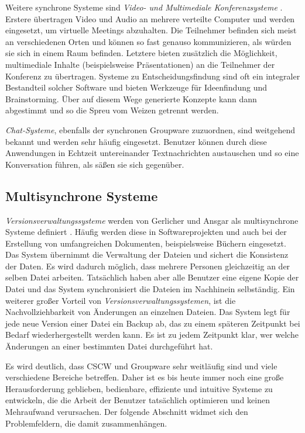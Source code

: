 Weitere synchrone Systeme sind \emph{Video- und Multimediale Konferenzsysteme} \citep{Gerlicher:2007p241}. Erstere übertragen Video und Audio an mehrere verteilte Computer und werden eingesetzt, um virtuelle Meetings abzuhalten. Die Teilnehmer befinden sich meist an verschiedenen Orten und können so fast genauso kommunizieren, als würden sie sich in einem Raum befinden. Letztere bieten zusätzlich die Möglichkeit, multimediale Inhalte (beispielsweise Präsentationen) an die Teilnehmer der Konferenz zu übertragen. Systeme zu Entscheidungsfindung sind oft ein integraler Bestandteil solcher Software und bieten Werkzeuge für Ideenfindung und Brainstorming. Über auf diesem Wege generierte Konzepte kann dann abgestimmt und so die Spreu vom Weizen getrennt werden. 

\emph{Chat-Systeme}, ebenfalls der synchronen Groupware zuzuordnen, sind weitgehend bekannt und werden sehr häufig eingesetzt. Benutzer können durch diese Anwendungen in Echtzeit untereinander Textnachrichten austauschen und so eine Konversation führen, als säßen sie sich gegenüber. 

\subsection{Multisynchrone Systeme}\label{sec:multisynchronousCSCW}

\emph{Versionsverwaltungssysteme} werden von Gerlicher und Ansgar als multisynchrone Systeme definiert \citep{Gerlicher:2007p241}. Häufig werden diese in Softwareprojekten und auch bei der Erstellung von umfangreichen Dokumenten, beispielsweise Büchern eingesetzt. Das System übernimmt die Verwaltung der Dateien und sichert die Konsistenz der Daten. Es wird dadurch möglich, dass mehrere Personen gleichzeitig an der selben Datei arbeiten. Tatsächlich haben aber alle Benutzer eine eigene Kopie der Datei und das System synchronisiert die Dateien im Nachhinein selbständig. Ein weiterer großer Vorteil von \emph{Versionsverwaltungssystemen}, ist die Nachvollziehbarkeit von Änderungen \citep{Gerlicher:2007p241} an einzelnen Dateien. Das System legt für jede neue Version einer Datei ein Backup ab, das zu einem späteren Zeitpunkt bei Bedarf wiederhergestellt werden kann. Es ist zu jedem Zeitpunkt klar, wer welche Änderungen an einer bestimmten Datei durchgeführt hat. 

\bigskip Es wird deutlich, dass \ac{CSCW} und Groupware sehr weitläufig sind und viele verschiedene Bereiche betreffen. Daher ist es bis heute immer noch eine große Herausforderung geblieben, bedienbare, effiziente und intuitive Systeme zu entwickeln, die die Arbeit der Benutzer tatsächlich optimieren und keinen Mehraufwand verursachen. Der folgende Abschnitt widmet sich den Problemfeldern, die damit zusammenhängen.

